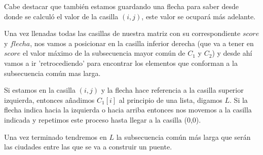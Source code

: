 \documentclass[11pt,letterpaper]{article}
\begin{document}
\begin{enumerate}[leftmargin=*]
    Cabe destacar que también estamos guardando una flecha para saber desde donde se calculó el valor de la casilla $(i,j)$, este valor se ocupará más adelante.

    Una vez llenadas todas las casillas de nuestra matriz con su correspondiente $score$ y $flecha$, nos vamos a posicionar en la casilla inferior derecha (que va a tener en $score$ el valor máximo de la subsecuencia mayor común de $C_1$ y $C_2$) y desde ahí vamos a ir 'retrocediendo' para encontrar los elementos que conforman a la subsecuencia común mas larga.

    Si estamos en la casilla $(i,j)$ y la flecha hace referencia a la casilla superior izquierda, entonces añadimos $C_1[i]$ al principio de una lista, digamos $L$. Si la flecha indica hacia la izquierda o hacia arriba entonces nos movemos a la casilla indicada y repetimos este proceso hasta llegar a la casilla (0,0).

    Una vez terminado tendremos en $L$ la subsecuencia común más larga que serán las ciudades entre las que se va a construir un puente.  
  \end{enumerate}
\end{document}
